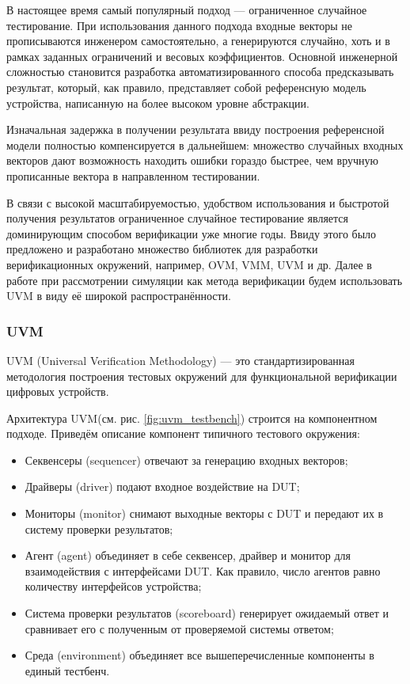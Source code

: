 \tab В настоящее время самый популярный подход --- ограниченное случайное тестирование. При использования данного подхода входные векторы не прописываются инженером самостоятельно, а генерируются случайно, хоть и в рамках заданных ограничений и весовых коэффициентов. Основной инженерной сложностью становится разработка автоматизированного способа предсказывать результат, который, как правило, представляет собой референсную модель устройства, написанную на более высоком уровне абстракции.

Изначальная задержка в получении результата ввиду построения референсной модели полностью компенсируется в дальнейшем: множество случайных входных векторов дают возможность находить ошибки гораздо быстрее, чем вручную прописанные вектора в направленном тестировании. 

В связи с высокой масштабируемостью, удобством использования и быстротой получения результатов ограниченное случайное тестирование является доминирующим способом верификации уже многие годы. Ввиду этого было предложено и разработано множество библиотек для разработки верификационных окружений, например, OVM, VMM, UVM и др. Далее в работе при рассмотрении симуляции как метода верификации будем использовать UVM в виду её широкой распространённости.

\subsubsection{UVM}

\tab UVM (Universal Verification Methodology)\cite{UVM_IEEE}\cite{UVM_CB} --- это стандартизированная методология построения тестовых окружений для функциональной верификации цифровых устройств.

Архитектура UVM(см. рис. \ref{fig:uvm_testbench}) строится на компонентном подходе. Приведём описание компонент типичного тестового окружения:

\begin{itemize}
    \item Секвенсеры (sequencer) отвечают за генерацию входных векторов;
    \item Драйверы (driver) подают входное воздействие на DUT;
    \item Мониторы (monitor) снимают выходные векторы с DUT и передают их в систему проверки результатов;
    \item Агент (agent) объединяет в себе секвенсер, драйвер и монитор для взаимодействия с интерфейсами DUT. Как правило, число агентов равно количеству интерфейсов устройства;
    \item Система проверки результатов (scoreboard) генерирует ожидаемый ответ и сравнивает его с полученным от проверяемой системы ответом;
    \item Среда (environment) объединяет все вышеперечисленные компоненты в единый тестбенч.
\end{itemize}

